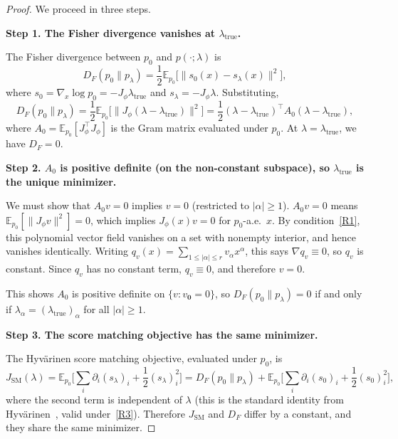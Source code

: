\documentclass{article}
\newcommand{\E}{\mathbb{E}}
\theoremstyle{definition}
\begin{document}
\begin{proof}
We proceed in three steps.

\textbf{Step 1. The Fisher divergence vanishes at $\lambda_{\mathrm{true}}$.}

The Fisher divergence between $p_0$ and $p(\cdot;\lambda)$ is
\begin{equation}\label{eq:app-fisher}
    D_F(p_0 \| p_\lambda)
    = \frac{1}{2}\E_{p_0}\bigl[\|s_0(x) - s_\lambda(x)\|^2\bigr],
\end{equation}
where $s_0 = \nabla_x \log p_0 = -J_\phi \lambda_{\mathrm{true}}$
and $s_\lambda = -J_\phi \lambda$.
Substituting,
\begin{equation}
    D_F(p_0 \| p_\lambda)
    = \frac{1}{2}\E_{p_0}\bigl[\|J_\phi(\lambda - \lambda_{\mathrm{true}})\|^2\bigr]
    = \frac{1}{2}(\lambda-\lambda_{\mathrm{true}})^\top A_0 (\lambda-\lambda_{\mathrm{true}}),
\end{equation}
where $A_0 = \E_{p_0}[J_\phi^\top J_\phi]$ is the Gram matrix
evaluated under $p_0$.
At $\lambda = \lambda_{\mathrm{true}}$, we have $D_F = 0$.

\textbf{Step 2. $A_0$ is positive definite (on the non-constant subspace),
so $\lambda_{\mathrm{true}}$ is the unique minimizer.}

We must show that $A_0 v = 0$ implies $v = 0$
(restricted to $|\alpha| \ge 1$).
$A_0 v = 0$ means $\E_{p_0}[\|J_\phi v\|^2] = 0$, which implies
$J_\phi(x) v = 0$ for $p_0$-a.e.\ $x$.
By condition~\ref{R1}, this polynomial vector field vanishes on a set
with nonempty interior, and hence vanishes identically. Writing
$q_v(x)=\sum_{1\le|\alpha|\le r}v_\alpha x^\alpha$, this says
$\nabla q_v \equiv 0$, so $q_v$ is constant. Since $q_v$ has no constant
term, $q_v\equiv0$, and therefore $v=0$.

This shows $A_0$ is positive definite on $\{v : v_{\mathbf{0}} = 0\}$,
so $D_F(p_0 \| p_\lambda) = 0$ if and only if $\lambda_\alpha = (\lambda_{\mathrm{true}})_\alpha$
for all $|\alpha| \ge 1$.

\textbf{Step 3. The score matching objective has the same minimizer.}

The Hyv\"arinen score matching objective, evaluated under $p_0$, is
\begin{equation}
    J_{\mathrm{SM}}(\lambda)
    = \E_{p_0}\biggl[\sum_i \partial_i (s_\lambda)_i
    + \frac{1}{2}(s_\lambda)_i^2\biggr]
    = D_F(p_0 \| p_\lambda)
    + \E_{p_0}\biggl[\sum_i \partial_i (s_0)_i
    + \frac{1}{2}(s_0)_i^2\biggr],
\end{equation}
where the second term is independent of $\lambda$
(this is the standard identity from Hyv\"arinen~\cite{hyvarinen2005},
valid under~\ref{R3}).
Therefore $J_{\mathrm{SM}}$ and $D_F$ differ by a constant,
and they share the same minimizer.


\end{proof}
\end{document}

